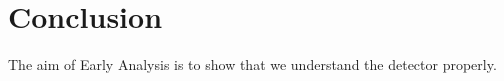 \section{Conclusion}
\label{s:conclusion}



The aim of Early Analysis is to show that we understand the detector properly.